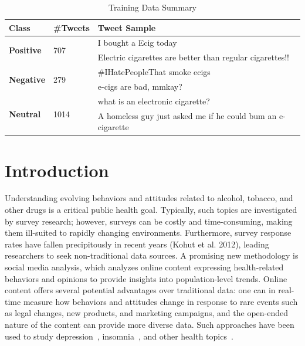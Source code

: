 \documentclass{sig-alternate}
\begin{document}
\begin{table}[ht!]
\centering
\caption{Training Data Summary\label{tab:labelsample}}
\begin{tabular}{|l|l|p{9cm}|}
\hline
{\bf Class}                     & {\bf \#Tweets}        & {\bf Tweet Sample}                                                                                                                       \\ \hline
\multirow{2}{*}{{\bf Positive}} & \multirow{2}{*}{707}  & I bought a Ecig today                                                                                                                    \\ %
                                &                       & Electric cigarettes are better than regular cigarettes!!                                          \\ \hline
\multirow{2}{*}{{\bf Negative}} & \multirow{2}{*}{279}  & \#IHatePeopleThat smoke ecigs                                                  \\ %
                                &                       & e-cigs are bad, mmkay?                                                                                                         \\ \hline
\multirow{2}{*}{{\bf Neutral}}  & \multirow{2}{*}{1014} &  what is an electronic cigarette?        \\ %
                                &                       & A homeless guy just asked me if he could bum an e-cigarette\\ \hline
\end{tabular}
\end{table}



\section{Introduction}
Understanding evolving behaviors and attitudes related to alcohol, tobacco,
and other drugs is a critical public health goal. Typically, such topics are
investigated by survey research; however, surveys can be costly and
time-consuming, making them ill-suited to rapidly changing
environments. Furthermore, survey response rates have fallen precipitously in
recent years (Kohut et al. 2012), leading researchers to seek non-traditional
data sources. A promising new methodology is social media analysis, which
analyzes online content expressing health-related behaviors and opinions to
provide insights into population-level trends. Online content offers several
potential advantages over traditional data: one can in real-time measure how
behaviors and attitudes change in response to rare events such as legal
changes, new products, and marketing campaigns, and the open-ended nature of
the content can provide more diverse data. Such approaches have been used to
study depression~\cite{choudhury2013predicting}, insomnia~\cite{powell2012i},
and other health topics~\cite{dredze2012how}.
\end{document}
